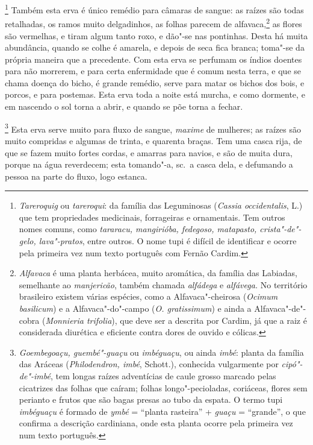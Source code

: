 \begin{linenumbers}
\footnote{ \textit{Tareroquig} ou \textit{tareroqui}: 
da família das Leguminosas (\textit{Cassia occidentalis}, L.) que
tem propriedades medicinais, forrageiras e ornamentais. Tem outros
nomes comuns, como \textit{tararacu, mangirióba, fedegoso, matapasto,
crista"-de"-gelo, lava"-pratos}, entre outros. O nome tupi é difícil de
identificar e ocorre pela primeira vez num texto português com Fernão
Cardim.} Também esta erva é único remédio para câmaras de
sangue: as raízes são todas retalhadas, os ramos muito delgadinhos, as
folhas parecem de alfavaca,\footnote{ \textit{Alfavaca} é uma
planta herbácea, muito aromática, da família das Labiadas, semelhante
ao \textit{manjericão}, também chamada \textit{alfádega} e 
\textit{alfávega.} No território brasileiro existem várias
espécies, como a Alfavaca"-cheirosa (\textit{Ocimum basilicum}) 
e a Alfavaca"-do"-campo (\textit{O. gratissimum}) e ainda a
Alfavaca"-de"-cobra (\textit{Monnieria trifolia}), que deve ser a
descrita por Cardim, já que a raiz é considerada diurética e eficiente
contra dores de ouvido e cólicas.} as flores são vermelhas, e tiram
algum tanto roxo, e dão"-se nas pontinhas. Desta há muita abundância,
quando se colhe é amarela, e depois de seca fica branca; toma"-se da
própria maneira que a precedente. Com esta erva se perfumam os índios
doentes para não morrerem, e para certa enfermidade que é comum nesta
terra, e que se chama doença do bicho, é grande remédio, serve para
matar os bichos dos bois, e porcos, e para postemas. Esta erva toda a
noite está murcha, e como dormente, e em nascendo o sol torna a abrir,
e quando se põe torna a fechar.

\footnote{ \textit{Goembegoaçu, guembé"-guaçu} ou
\textit{imbéguaçu}, ou ainda \textit{imbé}: planta da família das
Aráceas (\textit{Philodendron, imbé}, Schott.), conhecida
vulgarmente por \textit{cipó"-de"-imbé}, tem longas raízes adventícias de
caule grosso marcado pelas cicatrizes das folhas que caíram; folhas
longo"-pecioladas, coriáceas, flores sem perianto e frutos que são bagas
presas ao tubo da espata. O termo tupi \textit{imbéguaçu} é formado de
\textit{ymbé} = ``planta rasteira'' + \textit{guaçu} = ``grande'', o que
confirma a descrição cardiniana, onde esta planta ocorre pela primeira
vez num texto português.} Esta erva serve muito para fluxo
de sangue, \textit{maxime} de mulheres; as raízes são muito compridas e algumas
de trinta, e quarenta braças. Tem uma casca rija, de que se fazem muito
fortes cordas, e amarras para navios, e são de muita dura, porque na
água reverdecem; esta tomando"-a, sc.~a casca dela, e defumando a pessoa
na parte do fluxo, logo estanca.


\end{linenumbers}
